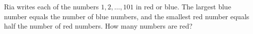 Ria writes each of the numbers $1,2,\dots,101$ in red or blue. The largest blue number equals the number of blue numbers, and the smallest red number equals half the number of red numbers. How many numbers are red?

